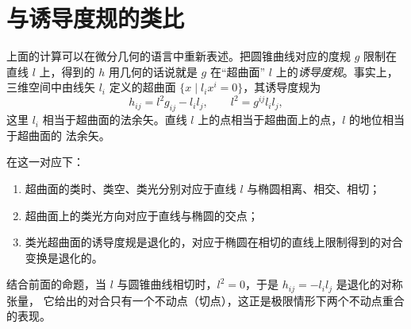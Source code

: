 \section{与诱导度规的类比}

上面的计算可以在微分几何的语言中重新表述。把圆锥曲线对应的度规 $g$ 限制在直线 $l$ 上，得到的
$h$ 用几何的话说就是 $g$ 在“超曲面” $l$ 上的\emph{诱导度规}。事实上，三维空间中由线矢 $l_i$
定义的超曲面 $\{x\mid l_ix^i=0\}$，其诱导度规为
\[
h_{ij}=l^2g_{ij}-l_il_j,\qquad l^2=g^{ij}l_il_j ,
\]
这里 $l_i$ 相当于超曲面的法余矢。直线 $l$ 上的点相当于超曲面上的点，$l$ 的地位相当于超曲面的
法余矢。

在这一对应下：
\begin{enumerate}
\item 超曲面的类时、类空、类光分别对应于直线 $l$ 与椭圆相离、相交、相切；
\item 超曲面上的类光方向对应于直线与椭圆的交点；
\item 类光超曲面的诱导度规是退化的，对应于椭圆在相切的直线上限制得到的对合变换是退化的。
\end{enumerate}

结合前面的命题，当 $l$ 与圆锥曲线相切时，$l^2=0$，于是 $h_{ij}=-l_il_j$ 是退化的对称张量，
它给出的对合只有一个不动点（切点），这正是极限情形下两个不动点重合的表现。
